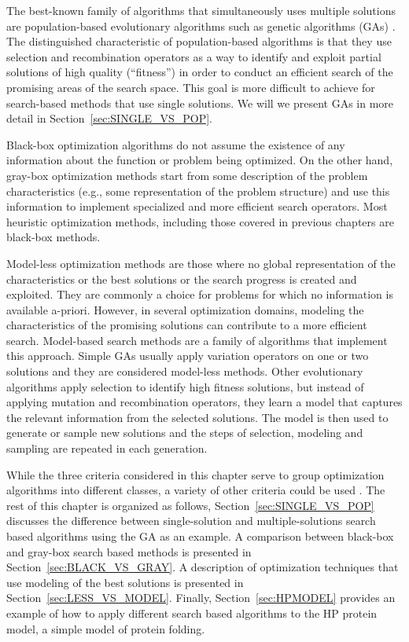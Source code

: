  The best-known family of algorithms that simultaneously uses multiple solutions are population-based evolutionary algorithms such as genetic algorithms (GAs) \cite{Goldberg:1989}. The distinguished  characteristic  of population-based algorithms is that they use selection and recombination operators as a way to identify and exploit partial solutions of high quality (``fitness'') in order to conduct an efficient search of the promising areas of the search space. This goal is more difficult to achieve for search-based methods that use single solutions.  We will we present GAs in more detail in Section~\ref{sec:SINGLE_VS_POP}. 

 Black-box optimization algorithms do not assume the existence of any information about the function or problem being optimized. On the other hand, gray-box optimization methods start from some description of the problem characteristics (e.g., some representation of the problem structure) and use this information to implement specialized and more efficient search operators. Most heuristic optimization methods, including those covered in previous chapters are black-box methods. 


 Model-less optimization methods are those where no global representation of the characteristics or the best solutions or the search progress is created and exploited. They are commonly a choice for problems for which no information is available a-priori. However, in several optimization domains, modeling the characteristics of the promising solutions can contribute to a more efficient search. Model-based search methods are a family of algorithms that implement this approach. Simple GAs  usually apply variation operators on one or two solutions and they are considered model-less methods.  Other evolutionary algorithms apply selection to identify high fitness solutions, but instead of applying mutation and recombination operators, they learn a model that captures the relevant information from the selected solutions. The model is then used to generate or sample new solutions and the steps of selection, modeling and sampling are repeated in each generation. 

 While the three criteria considered in this chapter serve to group optimization algorithms into different classes, a variety of other criteria could be used \cite{Stork_et_al:2020}. The rest of this chapter is organized as follows, Section~\ref{sec:SINGLE_VS_POP} discusses the difference between single-solution and multiple-solutions search based algorithms using the GA as an example.  A comparison between black-box and gray-box search based methods is presented in Section~\ref{sec:BLACK_VS_GRAY}. A description of optimization techniques that use modeling of the best solutions is presented in Section~\ref{sec:LESS_VS_MODEL}. Finally, Section~\ref{sec:HPMODEL} provides an example of how to apply different search based algorithms to the HP protein model, a simple model of protein folding. 


